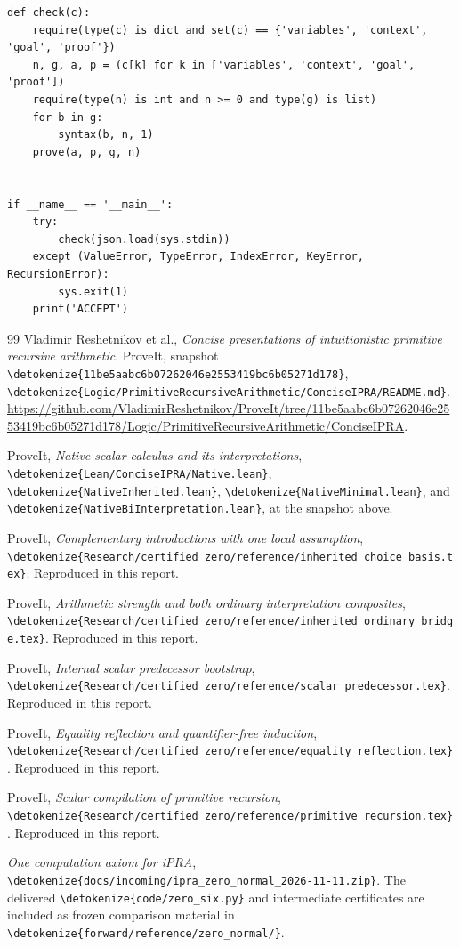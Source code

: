 \documentclass[11pt,letterpaper]{article}
\theoremstyle{definition}
\theoremstyle{remark}
\newcommand{\file}[1]{\expandafter\nolinkurl\expandafter{\detokenize{#1}}}
\begin{document}
\begin{lstlisting}
def check(c):
    require(type(c) is dict and set(c) == {'variables', 'context', 'goal', 'proof'})
    n, g, a, p = (c[k] for k in ['variables', 'context', 'goal', 'proof'])
    require(type(n) is int and n >= 0 and type(g) is list)
    for b in g:
        syntax(b, n, 1)
    prove(a, p, g, n)


if __name__ == '__main__':
    try:
        check(json.load(sys.stdin))
    except (ValueError, TypeError, IndexError, KeyError, RecursionError):
        sys.exit(1)
    print('ACCEPT')
\end{lstlisting}

\clearpage
\begin{thebibliography}{99}
Vladimir Reshetnikov et al.,
\emph{Concise presentations of intuitionistic primitive recursive arithmetic}.
ProveIt, snapshot
\file{11be5aabc6b07262046e2553419bc6b05271d178},
\file{Logic/PrimitiveRecursiveArithmetic/ConciseIPRA/README.md}.
\url{https://github.com/VladimirReshetnikov/ProveIt/tree/11be5aabc6b07262046e2553419bc6b05271d178/Logic/PrimitiveRecursiveArithmetic/ConciseIPRA}.

ProveIt, \emph{Native scalar calculus and its interpretations},
\file{Lean/ConciseIPRA/Native.lean},
\file{NativeInherited.lean}, \file{NativeMinimal.lean},
and \file{NativeBiInterpretation.lean}, at the snapshot above.

ProveIt, \emph{Complementary introductions with one local assumption},
\file{Research/certified_zero/reference/inherited_choice_basis.tex}.
Reproduced in this report.

ProveIt, \emph{Arithmetic strength and both ordinary interpretation composites},
\file{Research/certified_zero/reference/inherited_ordinary_bridge.tex}.
Reproduced in this report.

ProveIt, \emph{Internal scalar predecessor bootstrap},
\file{Research/certified_zero/reference/scalar_predecessor.tex}.
Reproduced in this report.

ProveIt, \emph{Equality reflection and quantifier-free induction},
\file{Research/certified_zero/reference/equality_reflection.tex}.
Reproduced in this report.

ProveIt, \emph{Scalar compilation of primitive recursion},
\file{Research/certified_zero/reference/primitive_recursion.tex}.
Reproduced in this report.

\emph{One computation axiom for iPRA},
\file{docs/incoming/ipra_zero_normal_2026-11-11.zip}.
The delivered \file{code/zero_six.py} and intermediate certificates are
included as frozen comparison material in \file{forward/reference/zero_normal/}.


\end{thebibliography}
\end{document}
